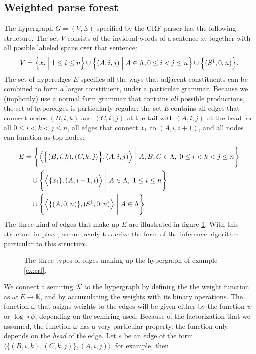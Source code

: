 \subsection{Weighted parse forest}
  The hypergraph $G = (V, E)$ specified by the CRF parser has the following structure. The set $V$ consists of the invidual words of a sentence $x$, together with all posible labeled spans over that sentence:
  \begin{align*}
    V = \Big\{ \x_i \; \Big\vert \; 1 \leq i \leq n \Big\} \cup \Big\{ (A, i, j) \; \Big\vert \; A \in \Lambda, 0 \leq i < j \leq n \Big\} \cup \Big\{ (S^{\dagger}, 0, n) \Big\}.
  \end{align*}
  The set of hyperedges $E$ specifies all the ways that adjacent constituents can be combined to form a larger constituent, under a particular grammar. Because we (implicitly) use a normal form grammar that contains \textit{all} possible productions, the set of hyperedges is particularly regular: the set $E$ contains all edges that connect nodes $(B, i, k)$ and $(C, k, j)$ at the tail with $(A, i, j)$ at the head for all $0 \leq i < k < j \leq n$, all edges that connect $\x_i$ to $(A, i, i+1)$, and all nodes can function as top nodes:
  \begin{align*}
    E
      &= \Bigg\{ \Big\langle \Big\{ (B, i, k), (C, k, j) \Big\},  (A, i, j) \Big\rangle \; \Bigg\vert \; A, B, C \in \Lambda, \; 0 \leq i < k < j \leq n \Bigg\}  \\
      &\quad\cup \Bigg\{ \Big\langle \{ \x_i \}, (A, i-1, i) \Big\rangle \; \Bigg\vert \; A \in \Lambda, \; 1 \leq i \leq n \Bigg\}  \\
      &\quad\cup \Bigg\{ \Big\langle \{ (A, 0, n) \}, (S^{\dagger}, 0, n) \Big\rangle \; \Bigg\vert \; A \in \Lambda \Bigg\}
  \end{align*}
  The three kind of edges that make up $E$ are illustrated in figure \ref{fig:crf-edges}. With this structure in place, we are ready to derive the form of the inference algorithm particular to this structure.
  \begin{figure}[h]
    \center
    \begin{tikzpicture}[scale=.6]
      
    \end{tikzpicture}
    \caption{The three types of edges making up the hypergraph of example \ref{ex:crf}.}
    \label{fig:crf-edges}
  \end{figure}
  We connect a semiring $\mathcal{K}$ to the hypergraph by defining the the weight function as $\omega: E \to \mathbb{K}$, and by accumulating the weights with its binary operations. The function $\omega$ that asigns weights to the edges will be given either by the function $\psi$ or $\log \circ \psi$, depending on the semiring used. Because of the factorization that we assumed, the function $\omega$ has a very particular property: the function only depends on the \textit{head} of the edge. Let $e$ be an edge of the form $\langle \{ (B, i, k), (C, k, j) \},  (A, i, j) \rangle$, for example, then
